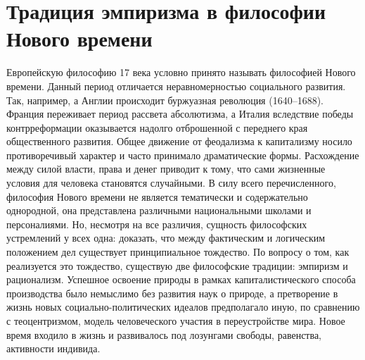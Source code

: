 \documentclass[12pt]{article}
\begin{document}
\section{Традиция эмпиризма в философии Нового времени}
Европейскую философию 17 века условно принято называть философией Нового времени. Данный период
отличается неравномерностью социального развития. Так, например, а Англии происходит буржуазная
революция (1640–1688). Франция переживает период рассвета абсолютизма, а Италия вследствие победы
контрреформации оказывается надолго отброшенной с переднего края общественного развития. Общее
движение от феодализма к капитализму носило противоречивый характер и часто принимало драматические
формы. Расхождение между силой власти, права и денег приводит к тому, что сами жизненные условия для
человека становятся случайными.
В силу всего перечисленного, философия Нового времени не является тематически и содержательно
однородной, она представлена различными национальными школами и персоналиями. Но, несмотря на
все различия, сущность философских устремлений у всех одна: доказать, что между фактическим и
логическим положением дел существует принципиальное тождество. По вопросу о том, как реализуется
это тождество, существую две философские традиции: эмпиризм и рационализм.
Успешное освоение природы в рамках капиталистического способа производства было немыслимо без
развития наук о природе, а претворение в жизнь новых социально-политических идеалов предполагало
иную, по сравнению с теоцентризмом, модель человеческого участия в переустройстве мира. Новое время
входило в жизнь и развивалось под лозунгами свободы, равенства, активности индивида.
\end{document}
